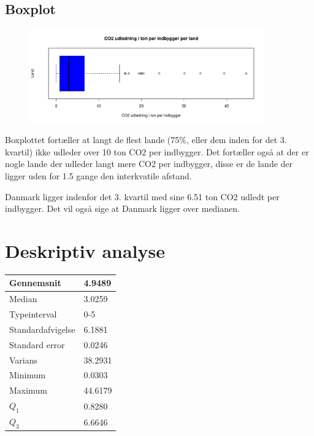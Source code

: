 \documentclass{article}
\begin{document}
\subsection{Boxplot}

\begin{figure}[H]
  \centering
  \includegraphics[width=0.9\textwidth]{co2boxplot.pdf}
\end{figure}

Boxplottet fortæller at langt de flest lande (75\%, eller dem inden for det 3.
kvartil) ikke udleder over 10 ton CO2 per indbygger. Det fortæller også at der
er nogle lande der udleder langt mere CO2 per indbygger, disse er de lande der
ligger uden for 1.5 gange den interkvatile afstand.

Danmark ligger indenfor det 3. kvartil med sine 6.51 ton CO2 udledt per
indbygger. Det vil også sige at Danmark ligger over medianen.

\section{Deskriptiv analyse}
\begin{table}[H]
  \begin{tabular}{l|l}
    Gennemsnit        & 4.9489  \\\hline
    Median            & 3.0259  \\\hline
    Typeinterval      & 0-5 \\\hline
    Standardafvigelse & 6.1881  \\\hline
    Standard error    & 0.0246  \\\hline
    Varians           & 38.2931 \\\hline
    Minimum           & 0.0303  \\\hline
    Maximum           & 44.6179 \\\hline
    $Q_1$             & 0.8280  \\\hline
    $Q_3$             & 6.6646 
  \end{tabular}
\end{table}
\end{document}
